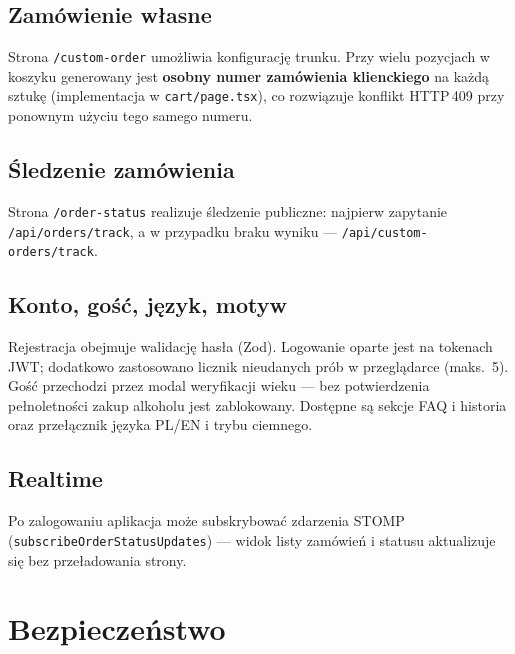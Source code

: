 \documentclass[12pt,a4paper]{report}
\newenvironment{calosc}{%
  \Needspace{17\baselineskip}%
  \begin{samepage}%
}{%
  \end{samepage}%
}
\begin{document}
\begin{calosc}
\section{Zamówienie własne}
Strona \texttt{/custom-order} umożliwia konfigurację trunku. Przy wielu pozycjach w koszyku generowany jest \textbf{osobny numer zamówienia klienckiego} na każdą sztukę (implementacja w \texttt{cart/page.tsx}), co rozwiązuje konflikt HTTP\,409 przy ponownym użyciu tego samego numeru.
\end{calosc}

\begin{calosc}
\section{Śledzenie zamówienia}
Strona \texttt{/order-status} realizuje śledzenie publiczne: najpierw zapytanie \texttt{/api/orders/track}, a w przypadku braku wyniku --- \texttt{/api/custom-orders/track}.
\end{calosc}

\begin{calosc}
\section{Konto, gość, język, motyw}
Rejestracja obejmuje walidację hasła (Zod). Logowanie oparte jest na tokenach JWT; dodatkowo zastosowano licznik nieudanych prób w przeglądarce (maks.\ 5). Gość przechodzi przez modal weryfikacji wieku --- bez potwierdzenia pełnoletności zakup alkoholu jest zablokowany. Dostępne są sekcje FAQ i historia oraz przełącznik języka PL/EN i trybu ciemnego.
\end{calosc}

\begin{calosc}
\section{Realtime}
Po zalogowaniu aplikacja może subskrybować zdarzenia STOMP (\texttt{subscribeOrderStatusUpdates}) --- widok listy zamówień i statusu aktualizuje się bez przeładowania strony.
\end{calosc}

\chapter{Bezpieczeństwo}
\end{document}
